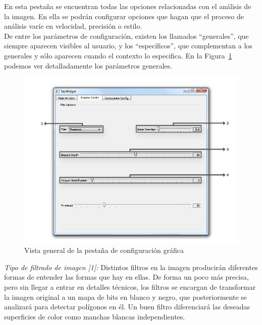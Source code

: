 		En esta pestaña se encuentran todas las opciones relacionadas con el análisis de la imagen. En ella se podrán configurar opciones que hagan que el proceso de análisis varíe en velocidad, precisión o estilo.\\
		
		De entre los parámetros de configuración, existen los llamados ``generales'', que siempre aparecen visibles al usuario, y los ``específicos'', que complementan a los generales y sólo aparecen cuando el contexto lo especifica. En la Figura~\ref{fig:interfazgraphic} podemos ver detalladamente los parámetros generales.\\
		
		\begin{figure}[htbp]
		\centering
		\hspace*{-0.9in}
		\includegraphics[scale=0.57]{graphics/interfazgraphic.png}
		\caption{Vista general de la pestaña de configuración gráfica}
		\label{fig:interfazgraphic}
		\end{figure}
		
		\noindent\textit{Tipo de filtrado de imagen [1]:} Distintos filtros en la imagen producirán diferentes formas de entender las formas que hay en ellas. De forma un poco más precisa, pero sin llegar a entrar en detalles técnicos, los filtros se encargan de transformar la imagen original a un mapa de bits en blanco y negro, que posteriormente se analizará para detectar polígonos en él. Un buen filtro diferenciará las deseadas superficies de color como manchas blancas independientes.\\
		
